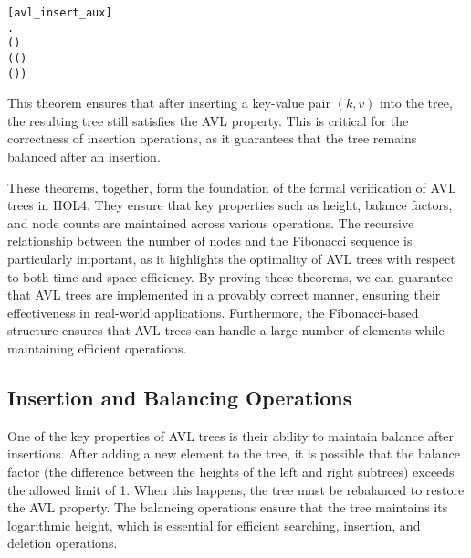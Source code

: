 \documentclass[12pt]{article}
\begin{document}
\begin{itemize}
\begin{alltt}
[avl_insert_aux]
\HOLTokenTurnstile{} \HOLSymConst{\HOLTokenForall{}}  .
       \HOLSymConst{\HOLTokenImp{}}
      (   ) \HOLSymConst{\HOLTokenConj{}}
     ( (   ) \HOLSymConst{=}   \HOLSymConst{\HOLTokenDisj{}}
       (   ) \HOLSymConst{=}   \HOLSymConst{\ensuremath{+}} )
\end{alltt}

  This theorem ensures that after inserting a key-value pair \( (k, v) \) into the tree, the resulting tree still satisfies the AVL property. This is critical for the correctness of insertion operations, as it guarantees that the tree remains balanced after an insertion.

\end{itemize}

These theorems, together, form the foundation of the formal verification of AVL trees in HOL4. They ensure that key properties such as height, balance factors, and node counts are maintained across various operations. The recursive relationship between the number of nodes and the Fibonacci sequence is particularly important, as it highlights the optimality of AVL trees with respect to both time and space efficiency. By proving these theorems, we can guarantee that AVL trees are implemented in a provably correct manner, ensuring their effectiveness in real-world applications. Furthermore, the Fibonacci-based structure ensures that AVL trees can handle a large number of elements while maintaining efficient operations.



\subsection{Insertion and Balancing Operations}

One of the key properties of AVL trees is their ability to maintain balance after insertions. After adding a new element to the tree, it is possible that the balance factor (the difference between the heights of the left and right subtrees) exceeds the allowed limit of 1. When this happens, the tree must be rebalanced to restore the AVL property. The balancing operations ensure that the tree maintains its logarithmic height, which is essential for efficient searching, insertion, and deletion operations.
\end{document}

